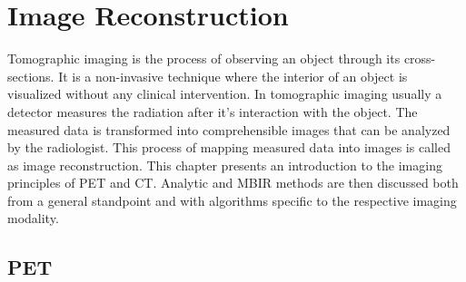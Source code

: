 
\chapter{Image Reconstruction} %

\label{Chapter1} %

Tomographic imaging is the process of observing an object through its cross-sections. It is a non-invasive technique where the interior of an object is visualized without any clinical intervention. In tomographic imaging usually a detector measures the radiation after it's interaction with the object. The measured data is transformed into comprehensible images that can be analyzed by the radiologist. This process of mapping measured data into images is called as image reconstruction. This chapter presents an introduction to the imaging principles of \ac{PET} and \ac{CT}. Analytic and \ac{MBIR} methods are then discussed both from a general standpoint and with algorithms specific to the respective imaging modality.  
\section{PET}

